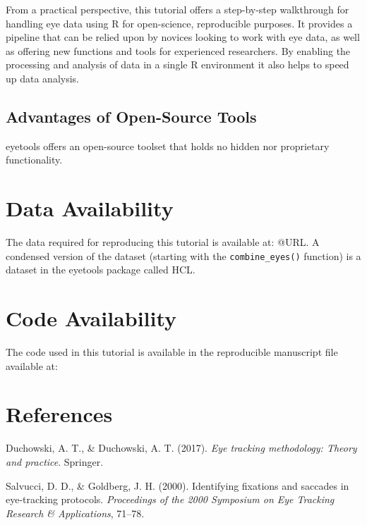 \documentclass[
  man,
  floatsintext,
  longtable,
  nolmodern,
  notxfonts,
  notimes,
  colorlinks=true,linkcolor=blue,citecolor=blue,urlcolor=blue]{apa7}
\newlength{\cslhangindent}
\newenvironment{CSLReferences}[2] %
 {\begin{list}{}{%
  \setlength{\itemindent}{0pt}
  \setlength{\leftmargin}{0pt}
  \setlength{\parsep}{0pt}
  \ifodd #1
   \setlength{\leftmargin}{\cslhangindent}
   \setlength{\itemindent}{-1\cslhangindent}
  \fi
  \setlength{\itemsep}{#2\baselineskip}}}
 {\end{list}}
\begin{document}
From a practical perspective, this tutorial offers a step-by-step
walkthrough for handling eye data using R for open-science, reproducible
purposes. It provides a pipeline that can be relied upon by novices
looking to work with eye data, as well as offering new functions and
tools for experienced researchers. By enabling the processing and
analysis of data in a single R environment it also helps to speed up
data analysis.

\subsection{Advantages of Open-Source
Tools}\label{advantages-of-open-source-tools}

eyetools offers an open-source toolset that holds no hidden nor
proprietary functionality.

\section{Data Availability}\label{data-availability}

The data required for reproducing this tutorial is available at: @URL. A
condensed version of the dataset (starting with the
\texttt{combine\_eyes()} function) is a dataset in the eyetools package
called HCL.

\section{Code Availability}\label{code-availability}

The code used in this tutorial is available in the reproducible
manuscript file available at:

\section{References}\label{references}

\label{refs}
\begin{CSLReferences}{1}{0}
Duchowski, A. T., \& Duchowski, A. T. (2017). \emph{Eye tracking
methodology: Theory and practice}. Springer.

Salvucci, D. D., \& Goldberg, J. H. (2000). Identifying fixations and
saccades in eye-tracking protocols. \emph{Proceedings of the 2000
Symposium on Eye Tracking Research \& Applications}, 71--78.

\end{CSLReferences}
\end{document}
